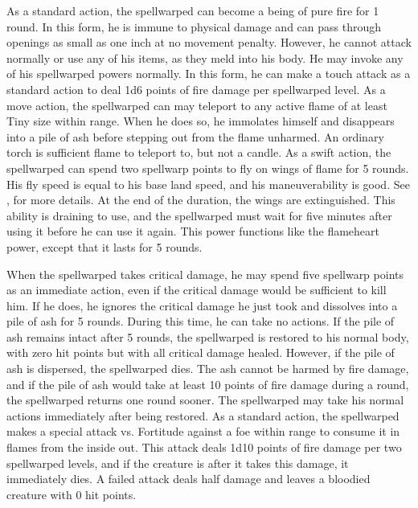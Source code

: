 As a standard action, the spellwarped can become a being of pure fire for 1 round.
In this form, he is immune to physical damage and can pass through openings as small as one inch at no movement penalty.
However, he cannot attack normally or use any of his items, as they meld into his body.
He may invoke any of his spellwarped powers normally.
In this form, he can make a touch attack as a standard action to deal 1d6 points of fire damage per spellwarped level.
As a move action, the spellwarped can may teleport to any active flame of at least Tiny size within \rngmed range.
When he does so, he immolates himself and disappears into a pile of ash before stepping out from the flame unharmed.
An ordinary torch is sufficient flame to teleport to, but not a candle.
As a swift action, the spellwarped can spend two spellwarp points to fly on wings of flame for 5 rounds.
His fly speed is equal to his base land speed, and his maneuverability is good.
See , for more details.
At the end of the duration, the wings are extinguished.
This ability is draining to use, and the spellwarped must wait for five minutes after using it before he can use it again.
This power functions like the flameheart power, except that it lasts for 5 rounds.

When the spellwarped takes critical damage, he may spend five spellwarp points as an immediate action, even if the critical damage would be sufficient to kill him.
If he does, he ignores the critical damage he just took and dissolves into a pile of ash for 5 rounds.
During this time, he can take no actions.
If the pile of ash remains intact after 5 rounds, the spellwarped is restored to his normal body, with zero hit points but with all critical damage healed.
However, if the pile of ash is dispersed, the spellwarped dies.
The ash cannot be harmed by fire damage, and if the pile of ash would take at least 10 points of fire damage during a round, the spellwarped returns one round sooner.
The spellwarped may take his normal actions immediately after being restored.
As a standard action, the spellwarped makes a special attack vs. Fortitude against a foe within \rngclose range to consume it in flames from the inside out.
This attack deals 1d10 points of fire damage per two spellwarped levels, and if the creature is \bloodied after it takes this damage, it immediately dies.
A failed attack deals half damage and leaves a bloodied creature with 0 hit points.


